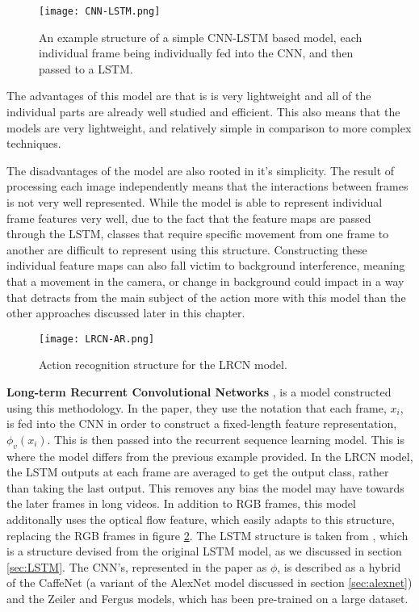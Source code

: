 \begin{figure}[h]
	\texttt{[image: CNN-LSTM.png]}
	\centering
	\caption{An example structure of a simple CNN-LSTM based model, each individual frame being individually fed into the CNN, and then passed to a LSTM.}
	\label{fig:cnn-lstm}
\end{figure}

The advantages of this model are that is is very lightweight and all of the individual parts are already well studied and efficient. This also means that the models are very lightweight, and relatively simple in comparison to more complex techniques.

The disadvantages of the model are also rooted in it's simplicity. The result of processing each image independently means that the interactions between frames is not very well represented. While the model is able to represent individual frame features very well, due to the fact that the feature maps are passed through the LSTM, classes that require specific movement from one frame to another are difficult to represent using this structure. Constructing these individual feature maps can also fall victim to background interference, meaning that a movement in the camera, or change in background could impact in a way that detracts from the main subject of the action more with this model than the other approaches discussed later in this chapter.

\begin{figure}[h]
	\texttt{[image: LRCN-AR.png]}
	\centering
	\caption{Action recognition structure for the LRCN model. \cite{LRCNS}}
	\label{fig:lrcn-ar}
\end{figure}

\textbf{Long-term Recurrent Convolutional Networks} \cite{LRCNS}, is a model constructed using this methodology. In the paper, they use the notation that each frame, $x_{i}$, is fed into the CNN in order to construct a fixed-length feature representation, $\phi_{v}(x_{i})$. This is then passed into the recurrent sequence learning model. This is where the model differs from the previous example provided. In the LRCN model, the LSTM outputs at each frame are averaged to get the output class, rather than taking the last output. This removes any bias the model may have towards the later frames in long videos. In addition to RGB frames, this model additonally uses the optical flow feature, which easily adapts to this structure, replacing the RGB frames in figure \ref{fig:lrcn-ar}. The LSTM structure is taken from \cite{LSTM-2015}, which is a structure devised from the original LSTM model, as we discussed in section \ref{sec:LSTM}. The CNN's, represented in the paper as $\phi$, is described as a hybrid of the CaffeNet \cite{caffenet} (a variant of the AlexNet \cite{alexnet} model discussed in section \ref{sec:alexnet}) and the Zeiler and Fergus \cite{zeilerfergus} models, which has been pre-trained on a large dataset.

